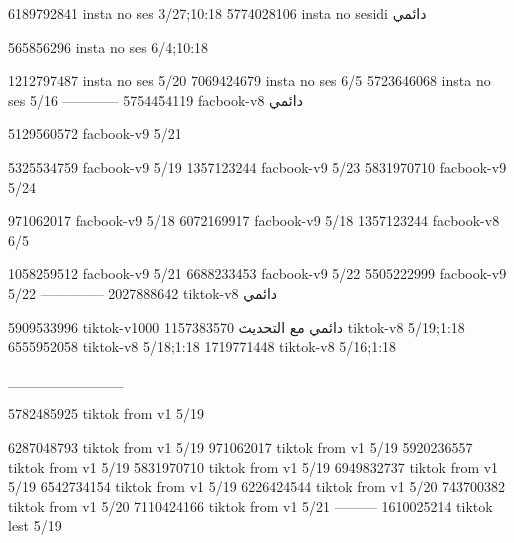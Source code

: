 
6189792841 insta no ses
3/27;10:18
5774028106 insta no sesidi
دائمي


565856296 insta no ses
6/4;10:18


1212797487 insta no ses
5/20
7069424679 insta no ses
6/5
5723646068 insta no ses
5/16
------------
5754454119 facbook-v8
دائمي

5129560572 facbook-v9
5/21

5325534759 facbook-v9
5/19
1357123244 facbook-v9
5/23
5831970710 facbook-v9
5/24

971062017 facbook-v9
5/18
6072169917 facbook-v9
5/18
1357123244 facbook-v8
6/5

1058259512 facbook-v9
5/21
6688233453 facbook-v9
5/22
5505222999 facbook-v9
5/22
--------------
2027888642 tiktok-v8
دائمي

5909533996 tiktok-v1000
دائمي مع التحديث
1157383570 tiktok-v8
5/19;1:18
6555952058 tiktok-v8
5/18;1:18
1719771448 tiktok-v8
5/16;1:18


___________

5782485925 tiktok from v1
5/19

6287048793 tiktok from v1
5/19
971062017 tiktok from v1
5/19
5920236557 tiktok from v1
5/19
5831970710 tiktok from v1
5/19
6949832737 tiktok from v1
5/19
6542734154 tiktok from v1
5/19
6226424544 tiktok from v1
5/20
743700382 tiktok from v1
5/20
7110424166 tiktok from v1
5/21
---------
1610025214 tiktok lest
5/19
